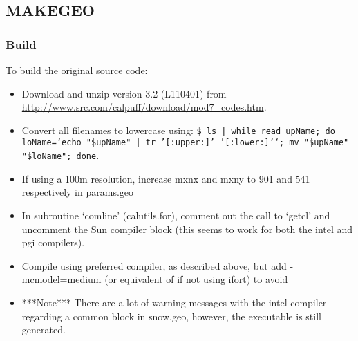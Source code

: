 \documentclass[10pt,a4paper]{article}
\begin{document}
\subsection{MAKEGEO}
\subsubsection{Build}
To build the original source code:
\begin{itemize}
\item Download and unzip version 3.2 (L110401) from \url{http://www.src.com/calpuff/download/mod7_codes.htm}.
\item Convert all filenames to lowercase using: \texttt{\$ ls | while read upName; do loName=`echo "\${upName}" | tr '[:upper:]' '[:lower:]'`; mv "\$upName" "\$loName"; done}.
\item If using a 100m resolution, increase mxnx and mxny to 901 and 541 respectively in params.geo
\item In subroutine `comline' (calutils.for), comment out the call to `getcl' and uncomment the Sun compiler block (this seems to work for both the intel and pgi compilers).
\item Compile using preferred compiler, as described above, but add -mcmodel=medium (or equivalent of if not using ifort) to avoid
\item ***Note*** There are a lot of warning messages with the intel compiler regarding a common block in snow.geo, however, the executable is still generated.
\end{itemize}
\end{document}
